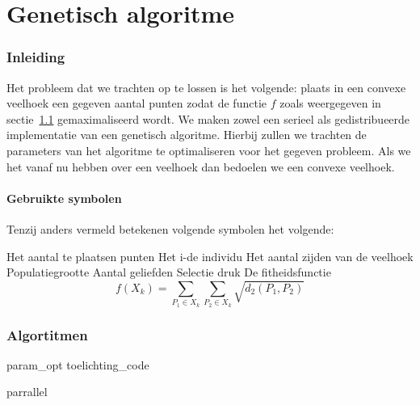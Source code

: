 \part{Genetisch algoritme}
\section{Inleiding}
\label{sec:inleiding}
Het probleem dat we trachten op te lossen is het volgende: plaats in een convexe veelhoek een gegeven aantal punten zodat de functie $f$ zoals weergegeven in sectie~\ref{sub:symbols} gemaximaliseerd wordt. We maken zowel een serieel als gedistribueerde implementatie van een genetisch algoritme. Hierbij zullen we trachten de parameters van het algoritme te optimaliseren voor het gegeven probleem.
Als we het vanaf nu hebben over een veelhoek dan bedoelen we een convexe veelhoek.

\subsection{Gebruikte symbolen}
\label{sub:symbols}
Tenzij anders vermeld betekenen volgende symbolen het volgende:
\begin{itemize}
 Het aantal te plaatsen punten
 Het i-de individu 
 Het aantal zijden van de veelhoek
 Populatiegrootte
 Aantal geliefden
 Selectie druk 
 De fitheidsfunctie \[f(X_k)= \sum_{P_1 \in X_k}\sum_{P_2 \in X_k} \sqrt{d_2(P_1,P_2)} \]
\end{itemize}



\section{Algortitmen}









 {param_opt}
 {toelichting_code}



 {parrallel}




